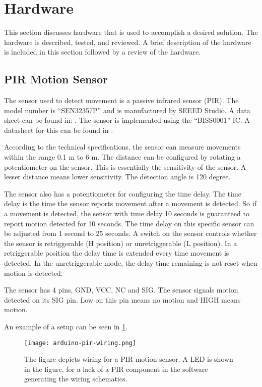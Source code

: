 \section{Hardware}
This section discusses hardware that is used to accomplish a desired solution.  The hardware is described, tested, and reviewed. A brief description of the hardware is included in this section followed by a review of the hardware.

\subsection{PIR Motion Sensor}

The sensor used to detect movement is a passive infrared sensor (PIR). The model
number is \enquote{SEN32357P} and is manufactured by SEEED Studio. A data sheet
can be found in:
\cite{datasheet_pir1}. The
sensor is implemented using the \enquote{BISS0001} IC. A datasheet for this can
be found in \cite{datasheet_pir2}.

According to the technical specifications, the sensor can measure movements within the range 0.1 m to 6
m. The distance can be configured by rotating a potentiometer on the
sensor. This is essentially the
sensitivity of the sensor. A lesser distance means lower sensitivity. The detection angle is 120 degree.

The sensor also has a potentiometer for configuring the time delay. The time
delay is the time the sensor reports movement after a movement is detected. So
if a movement is detected, the sensor with time delay 10 seconds is guaranteed
to report motion detected for 10 seconds. The time delay on this specific sensor
can be adjusted from 1 second to 25 seconds. A switch on the sensor controls
whether the sensor is retriggerable (H position) or unretriggerable (L
position). In a retriggerable position the delay time is extended every time
movement is detected. In the unretriggerable mode, the delay time remaining is
not reset when motion is detected.

The sensor has 4 pins, GND, VCC, NC and SIG. The sensor signals motion detected
on its SIG pin. Low on this pin means no motion and HIGH means motion.

An example of a setup can be seen in \cref{fig:arduino_pir_wiring}.

\begin{figure}[htbp]
  \centering
  \texttt{[image: arduino-pir-wiring.png]}
  \caption{The figure depicts wiring for a PIR motion sensor. A LED is shown in
    the figure, for a lack of a PIR component in the software generating the
    wiring schematics.}
  \label{fig:arduino_pir_wiring}
\end{figure}

